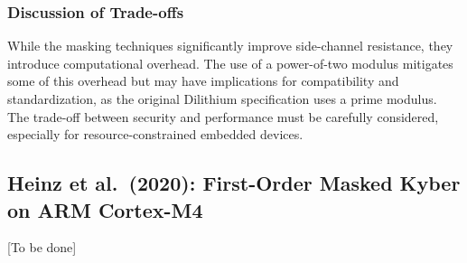 \subsubsection{Discussion of Trade-offs}

While the masking techniques significantly improve side-channel resistance, they introduce computational overhead. The use of a power-of-two modulus mitigates some of this overhead but may have implications for compatibility and standardization, as the original Dilithium specification uses a prime modulus. The trade-off between security and performance must be carefully considered, especially for resource-constrained embedded devices.





\subsection{Heinz et al.\ (2020): First-Order Masked Kyber on ARM Cortex-M4}

[To be done]

